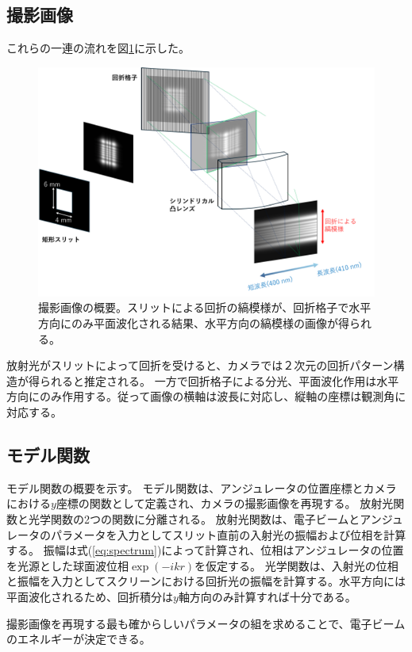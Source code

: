 \documentclass[a4paper,11pt,uplatex]{jsbook}
\begin{document}
\subsection{撮影画像}
これらの一連の流れを図\ref{propagation}に示した。
\begin{figure}[h]
  \centering
  \includegraphics[width=\linewidth]{image/2-propagation.png}
  \caption[撮影画像の概要]{撮影画像の概要。スリットによる回折の縞模様が、回折格子で水平方向にのみ平面波化される結果、水平方向の縞模様の画像が得られる。}
  \label{propagation}
\end{figure}
放射光がスリットによって回折を受けると、カメラでは２次元の回折パターン構造が得られると推定される。
一方で回折格子による分光、平面波化作用は水平方向にのみ作用する。従って画像の横軸は波長に対応し、縦軸の座標は観測角に対応する。
\subsection{モデル関数}
モデル関数の概要を示す。
モデル関数は、アンジュレータの位置座標とカメラにおける$y$座標の関数として定義され、カメラの撮影画像を再現する。
放射光関数と光学関数の2つの関数に分離される。
放射光関数は、電子ビームとアンジュレータのパラメータを入力としてスリット直前の入射光の振幅および位相を計算する。
振幅は式(\ref{eq:spectrum})によって計算され、位相はアンジュレータの位置を光源とした球面波位相$\exp(-ikr)$を仮定する。
光学関数は、入射光の位相と振幅を入力としてスクリーンにおける回折光の振幅を計算する。水平方向には平面波化されるため、回折積分は$y$軸方向のみ計算すれば十分である。

撮影画像を再現する最も確からしいパラメータの組を求めることで、電子ビームのエネルギーが決定できる。
\end{document}
